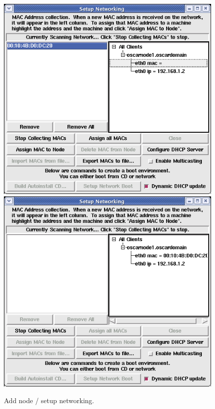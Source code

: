 \begin{figure}[!t]
  \begin{center}
    \centerline{
      \includegraphics[scale=\imgscale]{figs/6e_sbs-found-mac}
      \hspace{\imghskip}
      \includegraphics[scale=\imgscale]{figs/6f_sbs-stop-collect-mac2}
      }
    \caption{Add node / setup networking.}
    \label{fig:sbs-add-node1-setup-network}
  \end{center}
\end{figure}

